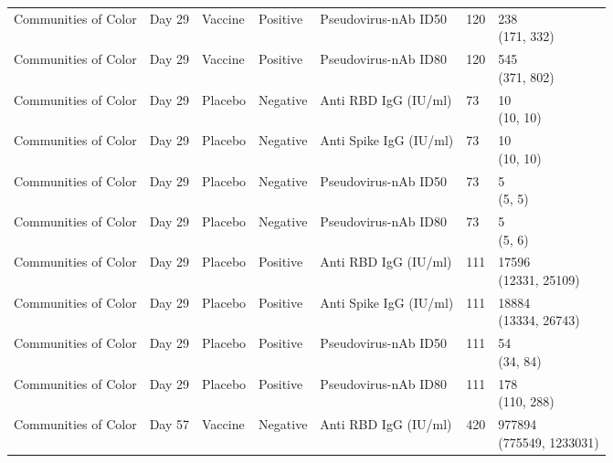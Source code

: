 \documentclass[]{book}
\theoremstyle{definition}
\theoremstyle{definition}
\theoremstyle{definition}
\newcommand{\1}{\mathbbm{1}}
\begin{document}
\begin{landscape}
\begin{ThreePartTable}
\begin{longtable}[t]{>{\raggedright\arraybackslash}p{7cm}llllll}
\hspace{1em}Communities of Color & Day 29 & Vaccine & Positive & Pseudovirus-nAb ID50 & 120 & \makecell[l]{238\\(171, 332)}\\
\hspace{1em}Communities of Color & Day 29 & Vaccine & Positive & Pseudovirus-nAb ID80 & 120 & \makecell[l]{545\\(371, 802)}\\
\hspace{1em}Communities of Color & Day 29 & Placebo & Negative & Anti RBD IgG (IU/ml) & 73 & \makecell[l]{10\\(10, 10)}\\
\hspace{1em}Communities of Color & Day 29 & Placebo & Negative & Anti Spike IgG (IU/ml) & 73 & \makecell[l]{10\\(10, 10)}\\
\hspace{1em}Communities of Color & Day 29 & Placebo & Negative & Pseudovirus-nAb ID50 & 73 & \makecell[l]{5\\(5, 5)}\\
\hspace{1em}Communities of Color & Day 29 & Placebo & Negative & Pseudovirus-nAb ID80 & 73 & \makecell[l]{5\\(5, 6)}\\
\hspace{1em}Communities of Color & Day 29 & Placebo & Positive & Anti RBD IgG (IU/ml) & 111 & \makecell[l]{17596\\(12331, 25109)}\\
\hspace{1em}Communities of Color & Day 29 & Placebo & Positive & Anti Spike IgG (IU/ml) & 111 & \makecell[l]{18884\\(13334, 26743)}\\
\hspace{1em}Communities of Color & Day 29 & Placebo & Positive & Pseudovirus-nAb ID50 & 111 & \makecell[l]{54\\(34, 84)}\\
\hspace{1em}Communities of Color & Day 29 & Placebo & Positive & Pseudovirus-nAb ID80 & 111 & \makecell[l]{178\\(110, 288)}\\
\hspace{1em}Communities of Color & Day 57 & Vaccine & Negative & Anti RBD IgG (IU/ml) & 420 & \makecell[l]{977894\\(775549, 1233031)}\\

\end{longtable}
\end{ThreePartTable}
\end{landscape}
\end{document}
